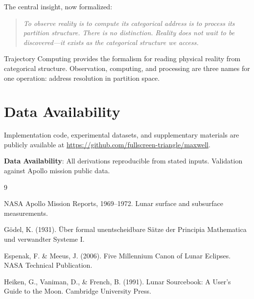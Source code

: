 \documentclass[twocolumn,10pt]{article}
\theoremstyle{definition}
\theoremstyle{remark}
\begin{document}
The central insight, now formalized:

\begin{quote}
\emph{To observe reality is to compute its categorical address is to process its partition structure. There is no distinction. Reality does not wait to be discovered---it exists as the categorical structure we access.}
\end{quote}

Trajectory Computing provides the formalism for reading physical reality from categorical structure. Observation, computing, and processing are three names for one operation: address resolution in partition space.

\vspace{1em}
\section*{Data Availability}

Implementation code, experimental datasets, and supplementary materials are publicly available at \url{https://github.com/fullscreen-triangle/maxwell}.

\vspace{1em}
\noindent\textbf{Data Availability}: All derivations reproducible from stated inputs. Validation against Apollo mission public data.


\begin{thebibliography}{9}

NASA Apollo Mission Reports, 1969--1972. Lunar surface and subsurface measurements.

G\"{o}del, K. (1931). \"{U}ber formal unentscheidbare S\"{a}tze der Principia Mathematica und verwandter Systeme I.

Espenak, F. \& Meeus, J. (2006). Five Millennium Canon of Lunar Eclipses. NASA Technical Publication.

Heiken, G., Vaniman, D., \& French, B. (1991). Lunar Sourcebook: A User's Guide to the Moon. Cambridge University Press.

\end{thebibliography}
\end{document}
